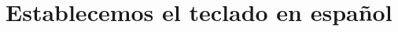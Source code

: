 \section{Establecemos el teclado en español}

  \begin{center}
    \begin{tcolorbox}[title=Establecemos el teclado en español]
    \end{tcolorbox}
   \end{center}
